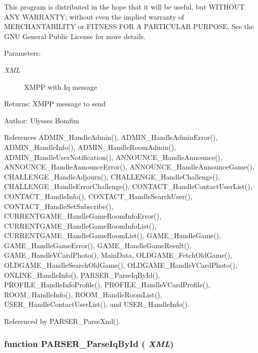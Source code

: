 This program is distributed in the hope that it will be useful, but WITHOUT ANY WARRANTY; without even the implied warranty of MERCHANTABILITY or FITNESS FOR A PARTICULAR PURPOSE. See the GNU General Public License for more details. \begin{Desc}
\item[Parameters:]
\begin{description}
\item[{\em XML}]XMPP with Iq message \end{description}
\end{Desc}
\begin{Desc}
\item[Returns:]XMPP message to send \end{Desc}
\begin{Desc}
\item[Author:]Ulysses Bomfim \end{Desc}


References ADMIN\_\-HandleAdmin(), ADMIN\_\-HandleAdminError(), ADMIN\_\-HandleInfo(), ADMIN\_\-HandleRoomAdmin(), ADMIN\_\-HandleUserNotification(), ANNOUNCE\_\-HandleAnnounce(), ANNOUNCE\_\-HandleAnnounceError(), ANNOUNCE\_\-HandleAnnounceGame(), CHALLENGE\_\-HandleAdjourn(), CHALLENGE\_\-HandleChallenge(), CHALLENGE\_\-HandleErrorChallenge(), CONTACT\_\-HandleContactUserList(), CONTACT\_\-HandleInfo(), CONTACT\_\-HandleSearchUser(), CONTACT\_\-HandleSetSubscribe(), CURRENTGAME\_\-HandleGameRoomInfoError(), CURRENTGAME\_\-HandleGameRoomInfoList(), CURRENTGAME\_\-HandleGameRoomList(), GAME\_\-HandleGame(), GAME\_\-HandleGameError(), GAME\_\-HandleGameResult(), GAME\_\-HandleVCardPhoto(), MainData, OLDGAME\_\-FetchOldGame(), OLDGAME\_\-HandleSearchOldGame(), OLDGAME\_\-HandleVCardPhoto(), ONLINE\_\-HandleInfo(), PARSER\_\-ParseIqById(), PROFILE\_\-HandleInfoProfile(), PROFILE\_\-HandleVCardProfile(), ROOM\_\-HandleInfo(), ROOM\_\-HandleRoomList(), USER\_\-HandleContactUserList(), and USER\_\-HandleInfo().

Referenced by PARSER\_\-ParseXml().
\subsubsection[PARSER\_\-ParseIqById]{\setlength{\rightskip}{0pt plus 5cm}function PARSER\_\-ParseIqById ( {\em XML})}\label{parser__iq_8js_f710f19fad9238f2a58badaa67831c5f}


